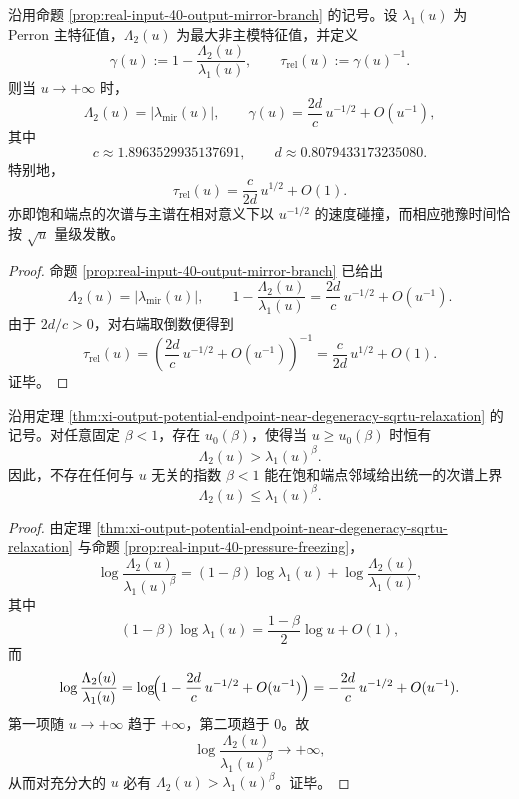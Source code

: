 \begin{theorem}\label{thm:xi-output-potential-endpoint-near-degeneracy-sqrtu-relaxation}
沿用命题 \ref{prop:real-input-40-output-mirror-branch} 的记号。设 \(\lambda_1(u)\) 为 Perron 主特征值，\(\Lambda_2(u)\) 为最大非主模特征值，并定义
\[
\gamma(u):=1-\frac{\Lambda_2(u)}{\lambda_1(u)},
\qquad
\tau_{\mathrm{rel}}(u):=\gamma(u)^{-1}.
\]
则当 \(u\to+\infty\) 时，
\[
\Lambda_2(u)=|\lambda_{\mathrm{mir}}(u)|,
\qquad
\gamma(u)=\frac{2d}{c}\,u^{-1/2}+O(u^{-1}),
\]
其中
\[
c\approx 1.8963529935137691,
\qquad
d\approx 0.8079433173235080.
\]
特别地，
\[
\boxed{\;
\tau_{\mathrm{rel}}(u)=\frac{c}{2d}\,u^{1/2}+O(1).\;}
\]
亦即饱和端点的次谱与主谱在相对意义下以 \(u^{-1/2}\) 的速度碰撞，而相应弛豫时间恰按 \(\sqrt u\) 量级发散。
\end{theorem}
\begin{proof}
命题 \ref{prop:real-input-40-output-mirror-branch} 已给出
\[
\Lambda_2(u)=|\lambda_{\mathrm{mir}}(u)|,
\qquad
1-\frac{\Lambda_2(u)}{\lambda_1(u)}
=
\frac{2d}{c}\,u^{-1/2}+O(u^{-1}).
\]
由于 \(2d/c>0\)，对右端取倒数便得到
\[
\tau_{\mathrm{rel}}(u)
=
\left(\frac{2d}{c}\,u^{-1/2}+O(u^{-1})\right)^{-1}
=
\frac{c}{2d}\,u^{1/2}+O(1).
\]
证毕。
\end{proof}

\begin{corollary}[饱和端点邻域不存在任何统一次谱幂指数节约]\label{cor:xi-output-potential-endpoint-no-uniform-subunit-spectral-exponent}
沿用定理 \ref{thm:xi-output-potential-endpoint-near-degeneracy-sqrtu-relaxation} 的记号。对任意固定 \(\beta<1\)，存在 \(u_0(\beta)\)，使得当 \(u\ge u_0(\beta)\) 时恒有
\[
\Lambda_2(u)>\lambda_1(u)^\beta.
\]
因此，不存在任何与 \(u\) 无关的指数 \(\beta<1\) 能在饱和端点邻域给出统一的次谱上界
\[
\Lambda_2(u)\le \lambda_1(u)^\beta.
\]
\end{corollary}
\begin{proof}
由定理 \ref{thm:xi-output-potential-endpoint-near-degeneracy-sqrtu-relaxation} 与命题 \ref{prop:real-input-40-pressure-freezing}，
\[
\log\frac{\Lambda_2(u)}{\lambda_1(u)^\beta}
=
(1-\beta)\log\lambda_1(u)+\log\frac{\Lambda_2(u)}{\lambda_1(u)},
\]
其中
\[
(1-\beta)\log\lambda_1(u)
=
\frac{1-\beta}{2}\log u+O(1),
\]
而
\[
\log\frac{\Lambda_2(u)}{\lambda_1(u)}
=
\log\!\Bigl(1-\frac{2d}{c}\,u^{-1/2}+O(u^{-1})\Bigr)
=
-\frac{2d}{c}\,u^{-1/2}+O(u^{-1}).
\]
第一项随 \(u\to+\infty\) 趋于 \(+\infty\)，第二项趋于 \(0\)。故
\[
\log\frac{\Lambda_2(u)}{\lambda_1(u)^\beta}\to +\infty,
\]
从而对充分大的 \(u\) 必有 \(\Lambda_2(u)>\lambda_1(u)^\beta\)。证毕。
\end{proof}


